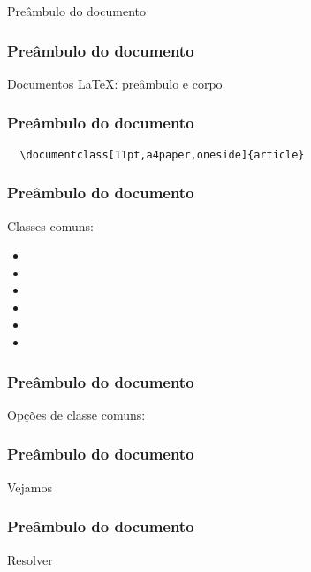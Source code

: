 \begin{frame}[standout]
  \Huge
  Preâmbulo do documento
\end{frame}

\begin{frame}
  \frametitle{Preâmbulo do documento}
  \LARGE
  Documentos \LaTeX: preâmbulo e corpo
\end{frame}

\begin{frame}[fragile]
  \frametitle{Preâmbulo do documento}
  \LARGE
  \begin{verbatim}
  \documentclass[11pt,a4paper,oneside]{article}
  \end{verbatim}
\end{frame}

\begin{frame}[fragile]
  \frametitle{Preâmbulo do documento}
  \huge
  Classes comuns:
  \begin{multicols}{2}
    \begin{itemize}
      \item{}
      \item{}
      \item{}
      \item{}
      \item{}
      \item{}
  \end{itemize}
\end{multicols}
\end{frame}

\begin{frame}
  \frametitle{Preâmbulo do documento}
  \LARGE
  Opções de classe comuns:
  \begin{itemize}
  \end{itemize}
\end{frame}

\begin{frame}
  \frametitle{Preâmbulo do documento}
  \huge
  Vejamos 
\end{frame}

\begin{frame}
  \frametitle{Preâmbulo do documento}
  \huge
  Resolver 
\end{frame}
